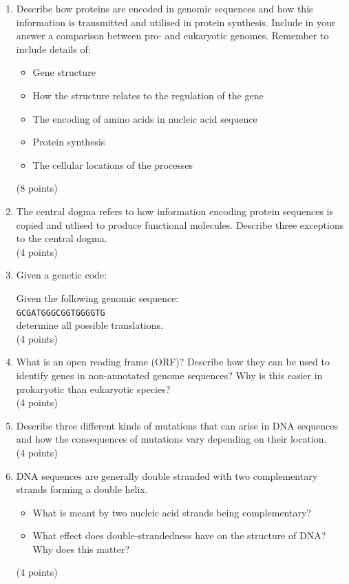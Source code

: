 \documentclass[11pt]{article}
\begin{document}
\begin{enumerate}
\item Describe how proteins are encoded in genomic sequences and how this
  information is transmitted and utilised in protein synthesis. Include in
  your answer a comparison between pro- and eukaryotic genomes. Remember to
  include details of:
  \begin{itemize}
  \item Gene structure
  \item How the structure relates to the regulation of the gene
  \item The encoding of amino acids in nucleic acid sequence
  \item Protein synthesis
  \item The cellular locations of the processes
  \end{itemize}
(8 points)

\item The central dogma refers to how information encoding protein sequences
  is copied and utlised to produce functional molecules. Describe three exceptions
  to the central dogma.\\
(4 points)

\item Given a genetic code:\\
  \begin{minipage}{0.6\textwidth}
  {\tiny
    
  }
  \end{minipage}

  Given the following genomic sequence:\\
  \verb|GCGATGGGCGGTGGGGTG|\\
  determine all possible translations.\\
  (4 points)

\item What is an open reading frame (ORF)? Describe how they can be used to identify
  genes in non-annotated genome sequences? Why is this easier in prokaryotic
  than eukaryotic species?\\
  (4 points)

\item Describe three different kinds of mutations that can arise in DNA
  sequences and how the consequences of mutations vary depending on their location.\\
  (4 points)

\item DNA sequences are generally double stranded with two complementary
  strands forming a double helix.
  \begin{itemize}
  \item What is meant by two nucleic acid strands being complementary?
  \item What effect does double-strandedness have on the structure of DNA? Why
    does this matter?
  \end{itemize}
(4 points)


\end{enumerate}
\end{document}
